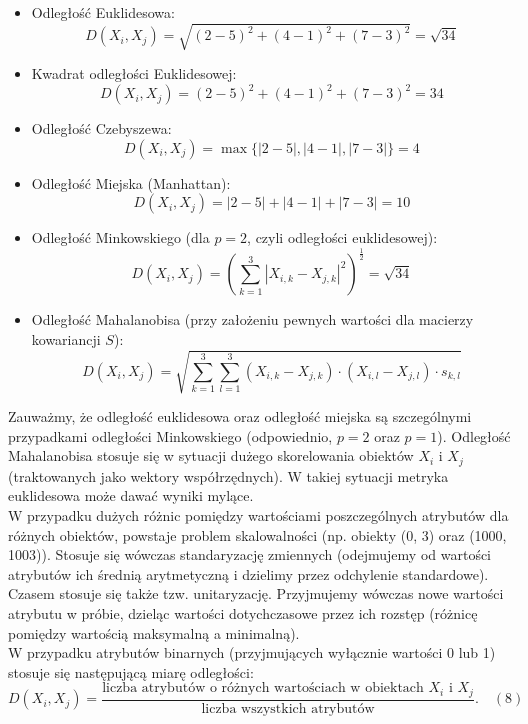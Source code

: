 \documentclass{article}
\begin{document}
\begin{itemize}
    \item Odległość Euklidesowa:
    \[
    D(X_i, X_j) = \sqrt{(2-5)^2 + (4-1)^2 + (7-3)^2} = \sqrt{34}
    \]

    \item Kwadrat odległości Euklidesowej:
    \[
    D(X_i, X_j) = (2-5)^2 + (4-1)^2 + (7-3)^2 = 34
    \]

    \item Odległość Czebyszewa:
    \[
    D(X_i, X_j) = \max\{|2-5|, |4-1|, |7-3|\} = 4
    \]

    \item Odległość Miejska (Manhattan):
    \[
    D(X_i, X_j) = |2-5| + |4-1| + |7-3| = 10
    \]

    \item Odległość Minkowskiego (dla \(p=2\), czyli odległości euklidesowej):
    \[
    D(X_i, X_j) = \left(\sum_{k=1}^{3} |X_{i,k} - X_{j,k}|^2\right)^{\frac{1}{2}} = \sqrt{34}
    \]

    \item Odległość Mahalanobisa (przy założeniu pewnych wartości dla macierzy kowariancji \(S\)):
    \[
    D(X_i, X_j) = \sqrt{\sum_{k=1}^{3} \sum_{l=1}^{3} (X_{i,k} - X_{j,k}) \cdot (X_{i,l} - X_{j,l}) \cdot s_{k,l}}
    \]
\end{itemize}



Zauważmy, że odległość euklidesowa oraz odległość miejska są szczególnymi przypadkami odległości Minkowskiego (odpowiednio, \(p = 2\) oraz \(p = 1\)). Odległość Mahalanobisa stosuje się w sytuacji dużego skorelowania obiektów \(X_i\) i \(X_j\) (traktowanych jako wektory współrzędnych). W takiej sytuacji metryka euklidesowa może dawać wyniki mylące. \\

W przypadku dużych różnic pomiędzy wartościami poszczególnych atrybutów dla różnych obiektów, powstaje problem skalowalności (np. obiekty (0, 3) oraz (1000, 1003)). Stosuje się wówczas standaryzację zmiennych (odejmujemy od wartości atrybutów ich średnią arytmetyczną i dzielimy przez odchylenie standardowe). \\

Czasem stosuje się także tzw. unitaryzację. Przyjmujemy wówczas nowe wartości atrybutu w próbie, dzieląc wartości dotychczasowe przez ich rozstęp (różnicę pomiędzy wartością maksymalną a minimalną). \\

W przypadku atrybutów binarnych (przyjmujących wyłącznie wartości 0 lub 1) stosuje się następującą miarę odległości:
\[
D(X_i, X_j) = \frac{\text{liczba atrybutów o różnych wartościach w obiektach } X_i \text{ i } X_j}{\text{liczba wszystkich atrybutów}}. \quad (8)
\]
\end{document}
